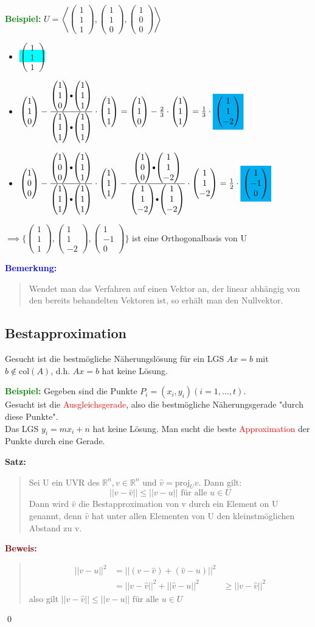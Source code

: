 \documentclass{article}
\newcommand{\red}[1]{\textcolor{red}{#1}}
\newcommand{\blue}[1]{\textcolor{blue}{#1}}
\newcommand{\green}[1]{\textcolor{green}{#1}}
\newcommand{\dgr}[1]{\textcolor{dgr}{#1}}
\newcommand{\maroon}[1]{\textcolor{maroon}{#1}}
\newcommand{\hcyan}[1]{\colorbox{cyan}{#1}}
\newcommand{\ex}{\green{\textbf{Beispiel: }}}
\newcommand{\an}[1]{\blue{\textbf{Bemerkung: }}\begin{quote}#1\end{quote}}
\newcommand{\se}[1]{\dgr{\textbf{Satz: }}\begin{quote}#1\end{quote}}
\newcommand{\pr}[1]{\maroon{\textbf{Beweis: }}\begin{quote}#1\end{quote}\qed}
\newcommand{\R}{\mathbb{R}}
\newcommand{\no}[1]{||#1||}
\newcommand{\vvvec}[3]{\begin{pmatrix}#1\\#2\\#3\end{pmatrix}}
\newcommand{\spann}[1]{\left\langle#1\right\rangle}
\newcommand{\col}{\text{col}}
\newcommand{\pro}{\text{proj}}
\begin{document}
\ex $U = \spann{\vvvec{1}{1}{1}, \vvvec{1}{1}{0}, \vvvec{1}{0}{0}}$
\begin{itemize}
    \item \hcyan{$\vvvec{1}{1}{1}$}
    \item $\vvvec{1}{1}{0} - \frac{\vvvec{1}{1}{0} \bullet \vvvec{1}{1}{1}}{\vvvec{1}{1}{1} \bullet \vvvec{1}{1}{1}} \cdot \vvvec{1}{1}{1} = \vvvec{1}{1}{0} - \frac{2}{3} \cdot \vvvec{1}{1}{1} = \frac{1}{3} \cdot \hcyan{$\vvvec{1}{1}{-2}$}$
    \item $\vvvec{1}{0}{0} - \frac{\vvvec{1}{0}{0} \bullet \vvvec{1}{1}{1}}{\vvvec{1}{1}{1} \bullet \vvvec{1}{1}{1}} \cdot \vvvec{1}{1}{1} - \frac{\vvvec{1}{0}{0} \bullet \vvvec{1}{1}{-2}}{\vvvec{1}{1}{-2} \bullet \vvvec{1}{1}{-2}} \cdot \vvvec{1}{1}{-2} = \frac{1}{2} \cdot \hcyan{$\vvvec{1}{-1}{0}$}$
\end{itemize}
\begin{center}
    $\implies \{\vvvec{1}{1}{1}, \vvvec{1}{1}{-2}, \vvvec{1}{-1}{0}\}$ ist eine Orthogonalbasis von U
\end{center}

\an{
    Wendet man das Verfahren auf einen Vektor an, der linear abhängig von den bereits behandelten Vektoren ist, so erhält man den Nullvektor.
}

\subsection{Bestapproximation}

Gesucht ist die bestmögliche Näherungslösung für ein LGS $Ax = b$ mit $b \notin \col(A)$, d.h. $Ax = b$ hat keine Lösung.

\ex Gegeben sind die Punkte $P_i = (x_i, y_i) (i = 1, \dots, t)$.\\
Gesucht ist die \red{Ausgleichsgerade}, also die bestmögliche Näherungsgerade "durch diese Punkte".\\
Das LGS $y_i = mx_i+n$ hat keine Lösung. Man sucht die beste \red{Approximation} der Punkte durch eine Gerade.

\se{
    Sei U ein UVR des $\R^n, v \in \R^n$ und $\hat{v} = \pro_Uv$. Dann gilt:
    \[
        \no{v - \hat{v}} \le \no{v - u} \text{ für alle } u \in U
    \]
    Dann wird $\hat{v}$ die Bestapproximation von v durch ein Element on U genannt, denn $\hat{v}$ hat unter allen Elementen von U den kleinstmöglichen Abstand zu v.
}
\pr{
    \vspace{-3em}
    \begin{align*}
        \no{v-u}^2 &= \no{(v-\hat{v})+(\hat{v}-u)}^2\\
        &= \no{v-\hat{v}}^2+ \no{\hat{v}-u}^2
        &\ge \no{v-\hat{v}}^2
    \end{align*}
    also gilt $\no{v - \hat{v}} \le \no{v - u} \text{ für alle } u \in U$
}
\end{document}
